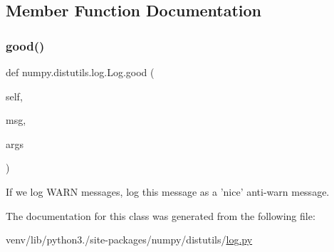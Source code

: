 \subsection{Member Function Documentation}
\mbox{\label{classnumpy_1_1distutils_1_1log_1_1Log_a39c95fb73840af463ef90108b254b9fa}} 
\subsubsection{\texorpdfstring{good()}{good()}}
{\footnotesize\ttfamily def numpy.\+distutils.\+log.\+Log.\+good (\begin{DoxyParamCaption}\item[{}]{self,  }\item[{}]{msg,  }\item[{}]{args }\end{DoxyParamCaption})}

\begin{DoxyVerb}If we log WARN messages, log this message as a 'nice' anti-warn
message.\end{DoxyVerb}
 

The documentation for this class was generated from the following file\+:\begin{DoxyCompactItemize}
\item 
venv/lib/python3./site-\/packages/numpy/distutils/\hyperlink{numpy_2distutils_2log_8py}{log.\+py}\end{DoxyCompactItemize}
